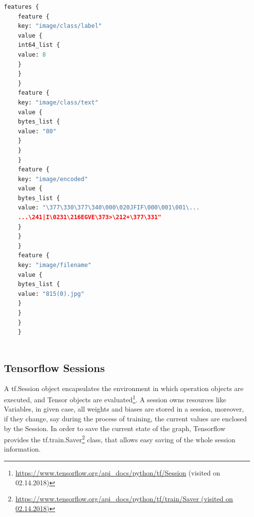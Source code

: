\begin{minipage}{0.95\linewidth}
	\begin{lstlisting}[language=python,  caption={Shortened TFRecord file containing one image with meta data}, label={lst:tfrecord},captionpos=b]
	features {
	feature {
	key: "image/class/label"
	value {
	int64_list {
	value: 8
	}
	}
	}
	feature {
	key: "image/class/text"
	value {
	bytes_list {
	value: "80"
	}
	}
	}
	feature {
	key: "image/encoded"
	value {
	bytes_list {
	value: "\377\330\377\340\000\020JFIF\000\001\001\...
	...\241|I\0231\216EGVE\373>\212+\377\331"
	}
	}
	}
	feature {
	key: "image/filename"
	value {
	bytes_list {
	value: "815(0).jpg"
	}
	}
	}
	}
	
	\end{lstlisting}
\end{minipage}
\newpage
\subsection{Tensorflow Sessions}
A tf.Session object encapsulates the environment in which operation objects are executed, and Tensor objects are evaluated\footnote{\url{https://www.tensorflow.org/api\_docs/python/tf/Session} (visited on 02.14.2018)}. A session owns resources like Variables, in given case, all weights and biases are stored in a session, moreover, if they change, say during the process of training, the current values are enclosed by the Session. In order to save the current state of the graph, Tensorflow provides the tf.train.Saver\footnote{\url{https://www.tensorflow.org/api\_docs/python/tf/train/Saver (visited on 02.14.2018)}} class, that allows easy saving of the whole session information. 

